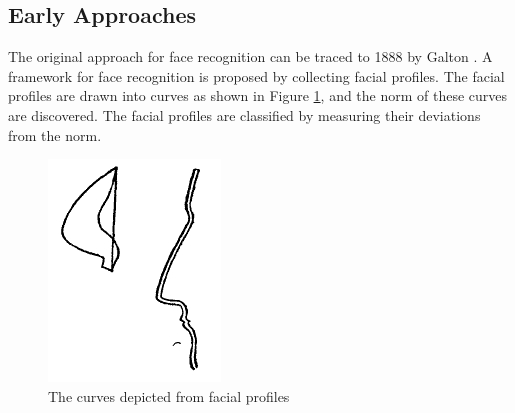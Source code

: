 \subsection{Early Approaches}
The original approach for face recognition can be traced to 1888 by Galton \cite{Galton1888}. A framework for face recognition is proposed by collecting facial profiles. The facial profiles are drawn into curves as shown in \mbox{Figure} \ref{fig:Galton1888}, and the norm of these curves are discovered. The facial profiles are classified by measuring their deviations from the norm.
\begin{figure}[ht]
 \begin{center}
\includegraphics[scale=0.5]{ch2/figures/Galton1888.jpg}
  \caption{The curves depicted from facial profiles \cite{Galton1888}}
\label{fig:Galton1888}
 \end{center}
\end{figure} 

